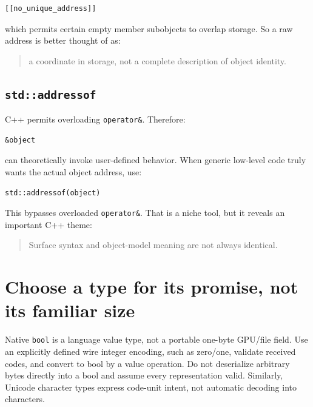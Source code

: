 \begin{verbatim}
[[no_unique_address]]
\end{verbatim}

which permits certain empty member subobjects to overlap storage. So a raw address is better thought of as:

\begin{quote}
a coordinate in storage, not a complete description of object identity.
\end{quote}

\subsection{\texorpdfstring{\texttt{std::addressof}}{std::addressof}}\label{05-engine-i-ch002-stdaddressof}

\hypertarget{05-engine-i-ch002-stdaddressof}{}

C++ permits overloading \texttt{operator\&}. Therefore:

\begin{verbatim}
&object
\end{verbatim}

can theoretically invoke user-defined behavior. When generic low-level code truly wants the actual object address, use:

\begin{verbatim}
std::addressof(object)
\end{verbatim}

This bypasses overloaded \texttt{operator\&}. That is a niche tool, but it reveals an important C++ theme:

\begin{quote}
Surface syntax and object-model meaning are not always identical.
\end{quote}

\section{Choose a type for its promise, not its familiar size}\label{05-engine-i-ch002-choose-a-type-for-its-promise-not-its-familiar-size}

\hypertarget{05-engine-i-ch002-choose-a-type-for-its-promise-not-its-familiar-size}{}

Native \texttt{bool} is a language value type, not a portable one-byte GPU/file field. Use an explicitly defined wire integer encoding, such as zero/one, validate received codes, and convert to bool by a value operation. Do not deserialize arbitrary bytes directly into a bool and assume every representation valid. Similarly, Unicode character types express code-unit intent, not automatic decoding into characters.

